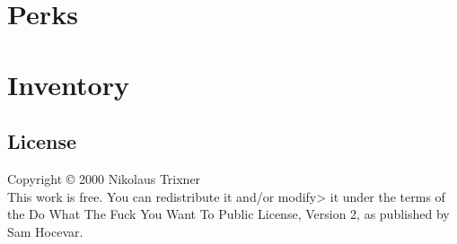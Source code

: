 \documentclass[a4paper]{book}
\begin{document}
    \part{Perks}\label{part:perks}
    
    
    
    
    
    
    

    \part{Inventory}\label{part:inventory}
    
    

    \begin{appendices}
        
        
        

        \chapter{License}\label{chapter:license}
        Copyright © 2000 Nikolaus Trixner\\
        This work is free.
        You can redistribute it and/or modify> it under the terms of the Do What The Fuck You Want To Public License, Version 2, as published by Sam Hocevar.
    \end{appendices}
\end{document}
